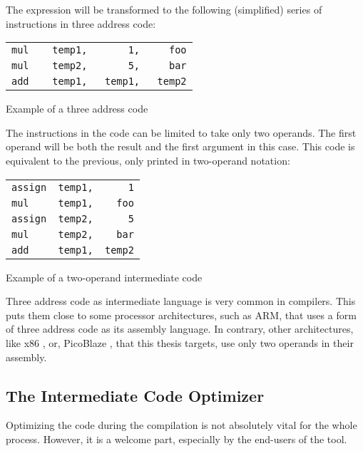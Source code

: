             The expression will be transformed to the following (simplified) series of instructions in three address code:

            \begin{listing}\centering\begin{tabular}{l}
            \verb|mul    temp1,       1,     foo|\\
            \verb|mul    temp2,       5,     bar|\\
            \verb|add    temp1,   temp1,   temp2|
            \end{tabular}
            \caption{Example of a three address code}\label{lst:tac}
            \end{listing}

            The instructions in the code can be limited to take only two operands. The first operand will be both the result and the first argument in this case. This code is equivalent to the previous, only printed in two-operand notation:

            \begin{listing}\centering\begin{tabular}{l}
            \verb|assign  temp1,      1|\\
            \verb|mul     temp1,    foo|\\
            \verb|assign  temp2,      5|\\
            \verb|mul     temp2,    bar|\\
            \verb|add     temp1,  temp2|\\
            \end{tabular}
            \caption{Example of a two-operand intermediate code}\label{lst:2ic}
            \end{listing}

            Three address code as intermediate language is very common in compilers. This puts them close to some processor architectures, such as ARM, that uses a form of three address code as its assembly language. \cite{ARM} In contrary, other architectures, like x86 \cite{x86}, or, PicoBlaze \cite{PicoBlaze6}, that this thesis targets, use only two operands in their assembly.

        \subsection{The Intermediate Code Optimizer}

            Optimizing the code during the compilation is not absolutely vital for the whole process. However, it is a welcome part, especially by the end-users of the tool.

